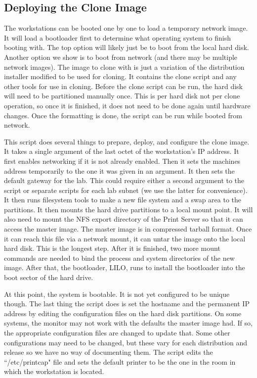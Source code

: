 \subsection{Deploying the Clone Image}
The workstations can be booted one by one to load a temporary network image.  It will load a bootloader first to determine what operating system to finish booting with.  The top option will likely just be to boot from the local hard disk.  Another option we show is to boot from network (and there may be multiple network images).  The image to clone with is just a variation of the distribution installer modified to be used for cloning.  It contains the clone script and any other tools for use in cloning.  Before the clone script can be run, the hard disk will need to be partitioned manually once.  This is per hard disk not per clone operation, so once it is finished, it does not need to be done again until hardware changes.  Once the formatting is done, the script can be run while booted from network.

This script does several things to prepare, deploy, and configure the clone image.  It takes a single argument of the last octet of the workstation's IP address.  It first enables networking if it is not already enabled.  Then it sets the machines address temporarily to the one it was given in an argument.  It then sets the default gateway for the lab.  This could require either a second argument to the script or separate scripts for each lab subnet (we use the latter for convenience).  It then runs filesystem tools to make a new file system and a swap area to the partitions.  It then mounts the hard drive partitions to a local mount point.  It will also need to mount the NFS export directory of the Print Server so that it can access the master image.  The master image is in compressed tarball format.  Once it can reach this file via a network mount, it can untar the image onto the local hard disk.  This is the longest step.  After it is finished, two more mount commands are needed to bind the process and system directories of the new image.  After that, the bootloader, LILO, runs to install the bootloader into the boot sector of the hard drive. 

At this point, the system is bootable.  It is not yet configured to be unique though.  The last thing the script does is set the hostname and the permanent IP address by editing the configuration files on the hard disk partitions.  On some systems, the monitor may not work with the defaults the master image had.  If so, the appropriate configuration files are changed to update that.  Some other configurations may need to be changed, but these vary for each distribution and release so we have no way of documenting them.  The script edits the ``/etc/printcap" file and sets the default printer to be the one in the room in which the workstation is located.


